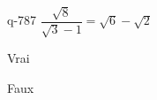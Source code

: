 \begin{truefalse}{q-787}
$\dfrac{\sqrt{8}}{\sqrt{3}-1} = \sqrt{6}-\sqrt{2}$
\item Vrai
\item* Faux
\end{truefalse}

